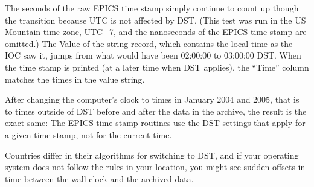 \medskip
\noindent The seconds of the raw EPICS time stamp simply continue to count up
though the transition because UTC is not affected by DST.
(This test was run in the US Mountain time zone, UTC+7, and the
nanoseconds of the EPICS time stamp are omitted.)
The Value of the string record, which contains the local time as the
IOC saw it, jumps from what would have been 02:00:00 to 03:00:00 DST.
When the time stamp is printed (at a later time when DST applies),
the ``Time'' column matches the times in the value string.

After changing the computer's clock to times in January 2004 and 2005,
that is to times outside of DST before and after the data in the
archive, the result is the exact same:
The EPICS time stamp routines use the DST settings that apply for a
given time stamp, not for the current time.

Countries differ in their algorithms for switching to DST, and if your
operating system does not follow the rules in your location, you might
see sudden offsets in time between the wall clock and the archived
data.
